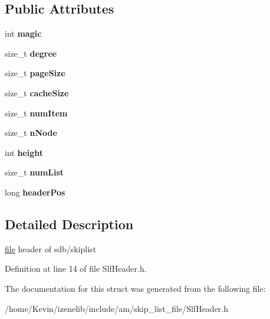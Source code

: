 \subsection*{Public Attributes}
\begin{CompactItemize}
\item 
\hypertarget{structSlfHeader_0a720f5d8a6e99d346f6d3e04d2407b1}{
int \textbf{magic}}
\label{structSlfHeader_0a720f5d8a6e99d346f6d3e04d2407b1}

\item 
\hypertarget{structSlfHeader_46dcfac81cbd3aa4f519fbb52ab90f9f}{
size\_\-t \textbf{degree}}
\label{structSlfHeader_46dcfac81cbd3aa4f519fbb52ab90f9f}

\item 
\hypertarget{structSlfHeader_32c217d828e167cbb2fcee5988be1967}{
size\_\-t \textbf{pageSize}}
\label{structSlfHeader_32c217d828e167cbb2fcee5988be1967}

\item 
\hypertarget{structSlfHeader_6304b7bbeedd848cc9ce943034af4d57}{
size\_\-t \textbf{cacheSize}}
\label{structSlfHeader_6304b7bbeedd848cc9ce943034af4d57}

\item 
\hypertarget{structSlfHeader_39e09e364ef2df224e9b4032115e95f6}{
size\_\-t \textbf{numItem}}
\label{structSlfHeader_39e09e364ef2df224e9b4032115e95f6}

\item 
\hypertarget{structSlfHeader_fba5b2bda419512e8bb4be324541dbc2}{
size\_\-t \textbf{nNode}}
\label{structSlfHeader_fba5b2bda419512e8bb4be324541dbc2}

\item 
\hypertarget{structSlfHeader_36776fc07ce3b79b2edf2adfc85ed92d}{
int \textbf{height}}
\label{structSlfHeader_36776fc07ce3b79b2edf2adfc85ed92d}

\item 
\hypertarget{structSlfHeader_a62614e672adb359a2af86a082e854ee}{
size\_\-t \textbf{numList}}
\label{structSlfHeader_a62614e672adb359a2af86a082e854ee}

\item 
\hypertarget{structSlfHeader_86dcd862de6648afdc5f39cff4b5b035}{
long \textbf{headerPos}}
\label{structSlfHeader_86dcd862de6648afdc5f39cff4b5b035}

\end{CompactItemize}


\subsection{Detailed Description}
\hyperlink{classfile}{file} header of sdb/skiplist 

Definition at line 14 of file SlfHeader.h.

The documentation for this struct was generated from the following file:\begin{CompactItemize}
\item 
/home/Kevin/izenelib/include/am/skip\_\-list\_\-file/SlfHeader.h\end{CompactItemize}
